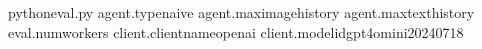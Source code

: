 \begin{MintedVerbatim}[commandchars=\\\{\}]
pythoneval.py
agent.typenaive
agent.max\PYGZus{}image\PYGZus{}history
agent.max\PYGZus{}text\PYGZus{}history
eval.num\PYGZus{}workers
client.client\PYGZus{}nameopenai
client.model\PYGZus{}idgpt\PYGZhy{}4o\PYGZhy{}mini\PYGZhy{}2024\PYGZhy{}07\PYGZhy{}18
\end{MintedVerbatim}
